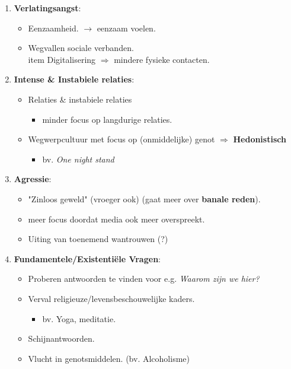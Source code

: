 \begin{enumerate}
	\item \textbf{Verlatingsangst}:
	\begin{itemize}
		\item Eenzaamheid. $\rightarrow$ eenzaam voelen.
		\item Wegvallen sociale verbanden.
		\\item Digitalisering $\Rightarrow$ mindere fysieke contacten.
	\end{itemize}
	\item\textbf{ Intense \& Instabiele relaties}:
	\begin{itemize}
		\item Relaties \& instabiele relaties
		\begin{itemize}
			\item minder focus op langdurige relaties.
		\end{itemize}
		\item Wegwerpcultuur met focus op (onmiddelijke) genot $\Rightarrow$ \textbf{Hedonistisch}
		\begin{itemize}
			\item bv. \textit{One night stand}
		\end{itemize}
	\end{itemize}
	\item \textbf{Agressie}:
	\begin{itemize}
		\item "Zinloos geweld" (vroeger ook) (gaat meer over \textbf{banale reden}).
		\item meer focus doordat media ook meer overspreekt.
		\item Uiting van toenemend wantrouwen (?)
	\end{itemize}
	\item \textbf{Fundamentele/Existenti\"ele Vragen}:
	\begin{itemize}
		\item  Proberen antwoorden te vinden voor e.g. \textit{ Waarom zijn we hier?}
		\item Verval religieuze/levensbeschouwelijke kaders.
		\begin{itemize}
			\item bv. Yoga, meditatie.
		\end{itemize}
		\item Schijnantwoorden.
		\item Vlucht in genotsmiddelen. (bv. Alcoholisme)


\end{itemize}
\end{enumerate}
